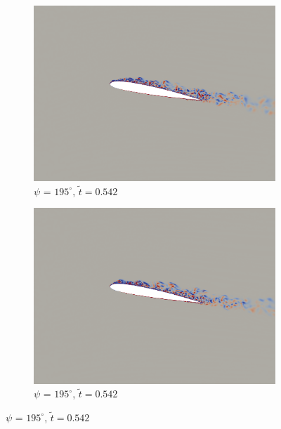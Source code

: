 \begin{figure}[H]
	\centering
	
	\begin{subfigure}[b]{0.4\textwidth}
		\centering
		\includegraphics[width=1\textwidth]{figures/SC1095/baseline/phase_195.png}
		\caption{ $\psi$ = $195^\circ$, $\tilde{t}=0.542$}
		\label{fig:SC1095_baseline_psi195}
	\end{subfigure}
	\begin{subfigure}[b]{0.4\textwidth}
		\centering
		\includegraphics[width=1\textwidth]{figures/SC1095/AC/phase_195.png}
		\caption{ $\psi$ = $195^\circ$, $\tilde{t}=0.542$}
		\label{fig:SC1095_AC_psi195}
	\end{subfigure}
	

\end{figure}
